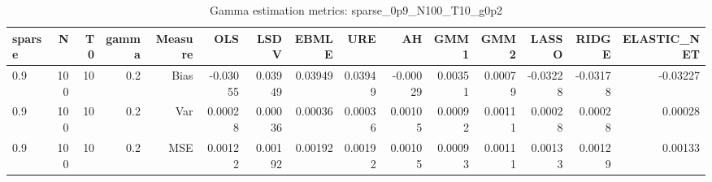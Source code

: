 \begin{table}[!htbp]\centering
\caption{Gamma estimation metrics: sparse_0p9_N100_T10_g0p2}
\label{tab:table1_sparse_0p9_N100_T10_g0p2}
\begin{tabular}{lrrrrrrrrrrrrrr}
\hline
sparse & N & T0 & gamma & Measure & OLS & LSDV & EBMLE & URE & AH & GMM1 & GMM2 & LASSO & RIDGE & ELASTIC_NET \\
\hline
0.9 & 100 & 10 & 0.2 & Bias & -0.03055 & 0.03949 & 0.03949 & 0.03949 & -0.00029 & 0.00351 & 0.00079 & -0.03228 & -0.03178 & -0.03227 \\
0.9 & 100 & 10 & 0.2 & Var & 0.00028 & 0.00036 & 0.00036 & 0.00036 & 0.00105 & 0.00092 & 0.00111 & 0.00028 & 0.00028 & 0.00028 \\
0.9 & 100 & 10 & 0.2 & MSE & 0.00122 & 0.00192 & 0.00192 & 0.00192 & 0.00105 & 0.00093 & 0.00111 & 0.00133 & 0.00129 & 0.00133 \\
\hline
\end{tabular}
\end{table}

